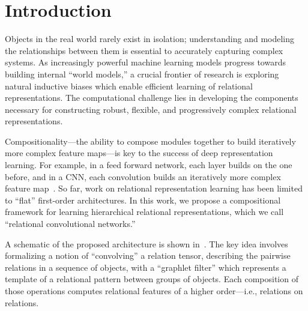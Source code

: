 \section{Introduction}\label{sec:intro}

Objects in the real world rarely exist in isolation; understanding and modeling the relationships between them is essential to accurately capturing complex systems. As increasingly powerful machine learning models progress towards building internal ``world models,'' a crucial frontier of research is exploring natural inductive biases which enable efficient learning of relational representations. The computational challenge lies in developing the components necessary for constructing robust, flexible, and progressively complex relational representations.


Compositionality---the ability to compose modules together to build iteratively more complex feature maps---is key to the success of deep representation learning. For example, in a feed forward network, each layer builds on the one before, and in a CNN, each convolution builds an iteratively more complex feature map~\citep{zeiler2014visualizing}. So far, work on relational representation learning has been limited to ``flat'' first-order architectures. In this work, we propose a compositional framework for learning hierarchical relational representations, which we call ``relational convolutional networks.''

A schematic of the proposed architecture is shown in~. The key idea involves formalizing a notion of ``convolving'' a relation tensor, describing the pairwise relations in a sequence of objects, with a ``graphlet filter'' which represents a template of a relational pattern between groups of objects. Each composition of those operations computes relational features of a higher order---i.e., relations on relations.

